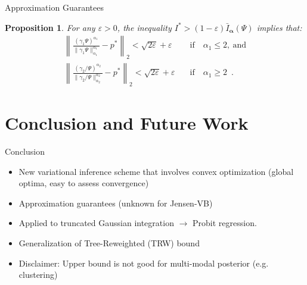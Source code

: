 \documentclass{beamer}
\newcommand{\balpha}{{\bm{\alpha}}}
\def\proba{p}
\newtheorem{proposition}{Proposition}
\begin{document}
\begin{frame}{Approximation Guarantees}
\begin{proposition}  
\label{th:approx}
For any $\varepsilon>0$, the inequality $I^* > (1-\varepsilon) \bar I_\balpha(\Psi)$ implies that:
\begin{align}
\left\|
	\frac{(\gamma_1\Psi)^{\alpha_1}}{\|\gamma_1\Psi\|^{\alpha_1}_{\alpha_1}} 
	- 
	\proba^*
\right\|_2 < \sqrt{2\varepsilon} + \varepsilon
\quad &  \mathrm{if} \quad \alpha_1 \le 2, \mathrm{\ and}
\\
\left\|
	\frac{(\gamma_2/\Psi)^{\alpha_2}}{\|\gamma_2/\Psi\|^{\alpha_2}_{\alpha_2}} 
	- 
	\proba^*
\right\|_2 < \sqrt{2\varepsilon} + \varepsilon
\quad  & \mathrm{if} \quad \alpha_1 \ge 2
\enspace.
\end{align}
\end{proposition} 

\end{frame}







\section{Conclusion and Future Work}
\begin{frame}{Conclusion}
	\begin{itemize}
	\item New variational inference scheme that involves convex optimization (global optima, easy to assess convergence)
	\item Approximation guarantees (unknown for Jensen-VB)
	\item Applied to truncated Gaussian integration $\rightarrow$ Probit regression.
	\item Generalization of Tree-Reweighted (TRW) bound 
		\item Disclaimer: Upper bound is not good for multi-modal posterior (e.g. clustering)
	\end{itemize}
\end{frame}
\end{document}
